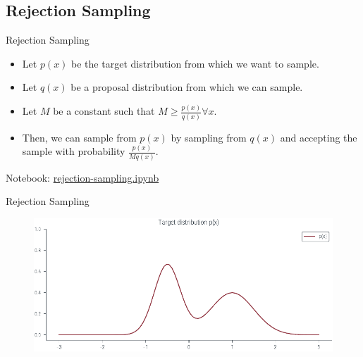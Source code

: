 \documentclass{beamer}
\begin{document}
\subsection{Rejection Sampling}
    \begin{frame}{Rejection Sampling}
        \begin{itemize}
            \item Let $p(x)$ be the target distribution from which we want to sample.
            \pause \item Let $q(x)$ be a proposal distribution from which we can sample.
            \pause \item Let $M$ be a constant such that $M \geq \frac{p(x)}{q(x)} \forall x$.
            \pause \item Then, we can sample from $p(x)$ by sampling from $q(x)$ and accepting the sample with probability $\frac{p(x)}{M q(x)}$.
        \end{itemize}
        
    \end{frame}

    \begin{frame}
        Notebook: \url{rejection-sampling.ipynb}
    \end{frame}

   \begin{frame}{Rejection Sampling}
    \begin{figure}
        \centering
        \includegraphics[scale = 0.75]{../figures/sampling/rejection-sampling--1.0-False-False-False-False-False-False-False-False.pdf}
    \end{figure}
    
   \end{frame}
\end{document}
